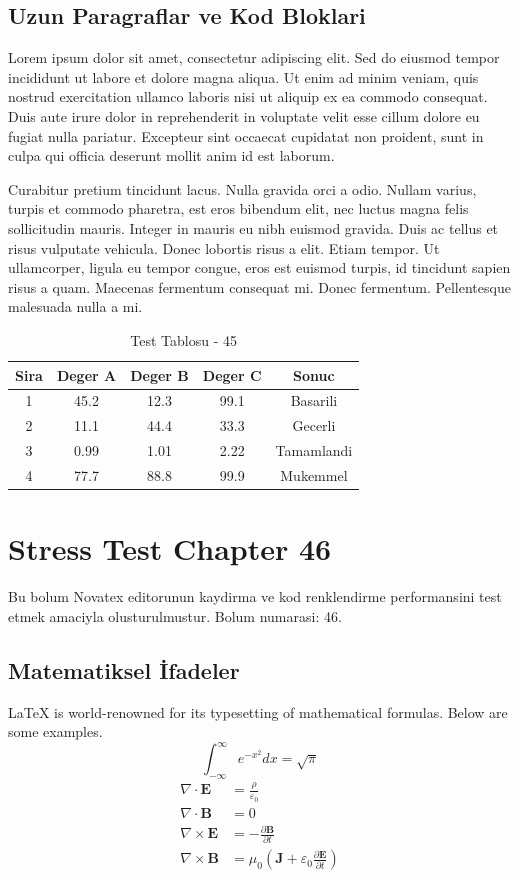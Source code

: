 \documentclass[12pt,a4paper]{article}
\begin{document}
\subsection{Uzun Paragraflar ve Kod Bloklari}
Lorem ipsum dolor sit amet, consectetur adipiscing elit. Sed do eiusmod tempor incididunt ut labore et dolore magna aliqua. Ut enim ad minim veniam, quis nostrud exercitation ullamco laboris nisi ut aliquip ex ea commodo consequat. Duis aute irure dolor in reprehenderit in voluptate velit esse cillum dolore eu fugiat nulla pariatur. Excepteur sint occaecat cupidatat non proident, sunt in culpa qui officia deserunt mollit anim id est laborum.

Curabitur pretium tincidunt lacus. Nulla gravida orci a odio. Nullam varius, turpis et commodo pharetra, est eros bibendum elit, nec luctus magna felis sollicitudin mauris. Integer in mauris eu nibh euismod gravida. Duis ac tellus et risus vulputate vehicula. Donec lobortis risus a elit. Etiam tempor. Ut ullamcorper, ligula eu tempor congue, eros est euismod turpis, id tincidunt sapien risus a quam. Maecenas fermentum consequat mi. Donec fermentum. Pellentesque malesuada nulla a mi.

\begin{table}[h!]
\centering
\begin{tabular}{|c|c|c|c|c|}
\hline
\textbf{Sira} & \textbf{Deger A} & \textbf{Deger B} & \textbf{Deger C} & \textbf{Sonuc} \\
\hline
1 & 45.2 & 12.3 & 99.1 & Basarili \\
2 & 11.1 & 44.4 & 33.3 & Gecerli \\
3 & 0.99 & 1.01 & 2.22 & Tamamlandi \\
4 & 77.7 & 88.8 & 99.9 & Mukemmel \\
\hline
\end{tabular}
\caption{Test Tablosu - 45}
\end{table}

\newpage
\section{Stress Test Chapter 46}
Bu bolum Novatex editorunun kaydirma ve kod renklendirme performansini test etmek amaciyla olusturulmustur. Bolum numarasi: 46.

\subsection{Matematiksel İfadeler}
\LaTeX{} is world-renowned for its typesetting of mathematical formulas. Below are some examples.
\begin{equation}
\int_{-\infty}^{\infty} e^{-x^2} dx = \sqrt{\pi}
\end{equation}
\begin{align}
\nabla \cdot \mathbf{E} &= \frac{\rho}{\varepsilon_0} \\
\nabla \cdot \mathbf{B} &= 0 \\
\nabla \times \mathbf{E} &= -\frac{\partial \mathbf{B}}{\partial t} \\
\nabla \times \mathbf{B} &= \mu_0\left(\mathbf{J} + \varepsilon_0 \frac{\partial \mathbf{E}}{\partial t}\right)
\end{align}
\end{document}
